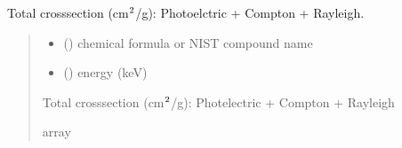 \documentclass[letterpaper,10pt,english,openany,oneside]{sphinxmanual}
\begin{document}
\begin{fulllineitems}
\label{\detokenize{api/cross_sections:dxraylib.CS_Total_CP}}
\pysigstartsignatures
{}
\pysigstopsignatures
\sphinxAtStartPar
Total cross\sphinxhyphen{}section (cm\(\sp{\text{2}}\)/g): Photoelctric + Compton + Rayleigh.
\begin{quote}\begin{description}
\begin{itemize}
\item {} 
\sphinxAtStartPar
{} () \textendash{} chemical formula or NIST compound name

\item {} 
\sphinxAtStartPar
{} () \textendash{} energy (keV)

\end{itemize}

\sphinxAtStartPar
Total cross\sphinxhyphen{}section (cm\(\sp{\text{2}}\)/g): Photelectric + Compton + Rayleigh

\sphinxAtStartPar
array

\end{description}\end{quote}

\end{fulllineitems}


\begin{DUlineblock}{0em}
\item[] 
\end{DUlineblock}
\end{document}
